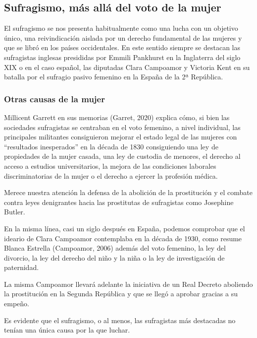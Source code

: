 \documentclass[
]{article}
\begin{document}
\hypertarget{sufragismo-muxe1s-alluxe1-del-voto-de-la-mujer}{%
\subsection{Sufragismo, más allá del voto de la
mujer}\label{sufragismo-muxe1s-alluxe1-del-voto-de-la-mujer}}

El sufragismo se nos presenta habitualmente como una lucha con un
objetivo único, una reivindicación aislada por un derecho fundamental de
las mujeres y que se libró en los países occidentales. En este sentido
siempre se destacan las sufragistas inglesas presididas por Emmili
Pankhurst en la Inglaterra del siglo XIX o en el caso español, las
diputadas Clara Campoamor y Victoria Kent en su batalla por el sufragio
pasivo femenino en la España de la 2ª República.

\hypertarget{otras-causas-de-la-mujer}{%
\subsubsection{Otras causas de la
mujer}\label{otras-causas-de-la-mujer}}

Millicent Garrett en sus memorias (Garret, 2020) explica cómo, si bien
las sociedades sufragistas se centraban en el voto femenino, a nivel
individual, las principales militantes consiguieron mejorar el estado
legal de las mujeres con ``resultados inesperados'' en la década de 1830
consiguiendo una ley de propiedades de la mujer casada, una ley de
custodia de menores, el derecho al acceso a estudios universitarios, la
mejora de las condiciones laborales discriminatorias de la mujer o el
derecho a ejercer la profesión médica.

Merece nuestra atención la defensa de la abolición de la prostitución y
el combate contra leyes denigrantes hacia las prostitutas de sufragistas
como Josephine Butler.

En la misma línea, casi un siglo después en España, podemos comprobar
que el ideario de Clara Campoamor contemplaba en la década de 1930, como
resume Blanca Estrella (Campoamor, 2006) además del voto femenino, la
ley del divorcio, la ley del derecho del niño y la niña o la ley de
investigación de paternidad.

La misma Campoamor llevará adelante la iniciativa de un Real Decreto
aboliendo la prostitución en la Segunda República y que se llegó a
aprobar gracias a su empeño.

Es evidente que el sufragismo, o al menos, las sufragistas más
destacadas no tenían una única causa por la que luchar.
\end{document}
